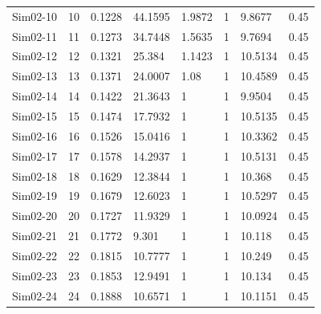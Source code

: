 \documentclass [10pt] {article}
\begin{document}
\begin{table}[H]
\begin{tabular}{c|cllllll}
		Sim02-10 & 10         & 0.1228                          & 44.1595       & 1.9872    & 1              & 9.8677        & 0.45      \\
		Sim02-11 & 11         & 0.1273                          & 34.7448       & 1.5635    & 1              & 9.7694        & 0.45      \\
		Sim02-12 & 12         & 0.1321                          & 25.384        & 1.1423    & 1              & 10.5134       & 0.45      \\
		Sim02-13 & 13         & 0.1371                          & 24.0007       & 1.08      & 1              & 10.4589       & 0.45      \\
		Sim02-14 & 14         & 0.1422                          & 21.3643       & 1         & 1              & 9.9504        & 0.45      \\
		Sim02-15 & 15         & 0.1474                          & 17.7932       & 1         & 1              & 10.5135       & 0.45      \\
		Sim02-16 & 16         & 0.1526                          & 15.0416       & 1         & 1              & 10.3362       & 0.45      \\
		Sim02-17 & 17         & 0.1578                          & 14.2937       & 1         & 1              & 10.5131       & 0.45      \\
		Sim02-18 & 18         & 0.1629                          & 12.3844       & 1         & 1              & 10.368        & 0.45      \\
		Sim02-19 & 19         & 0.1679                          & 12.6023       & 1         & 1              & 10.5297       & 0.45      \\
		Sim02-20 & 20         & 0.1727                          & 11.9329       & 1         & 1              & 10.0924       & 0.45      \\
		Sim02-21 & 21         & 0.1772                          & 9.301         & 1         & 1              & 10.118        & 0.45      \\
		Sim02-22 & 22         & 0.1815                          & 10.7777       & 1         & 1              & 10.249        & 0.45      \\
		Sim02-23 & 23         & 0.1853                          & 12.9491       & 1         & 1              & 10.134        & 0.45      \\
		Sim02-24 & 24         & 0.1888                          & 10.6571       & 1         & 1              & 10.1151       & 0.45      \\

\end{tabular}
\end{table}
\end{document}
